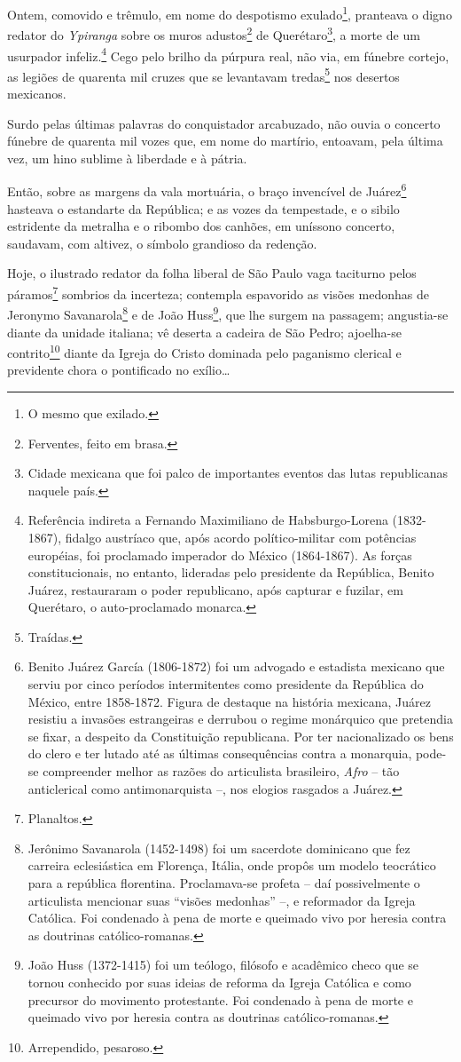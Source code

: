 Ontem, comovido e trêmulo, em nome do despotismo exulado\footnote{O
  mesmo que exilado.}, pranteava o digno redator do \emph{Ypiranga}
sobre os muros adustos\footnote{Ferventes, feito em brasa.} de
Querétaro\footnote{Cidade mexicana que foi palco de importantes
  eventos das lutas republicanas naquele país.}, a morte de um usurpador
infeliz.\footnote{Referência indireta a Fernando Maximiliano de
  Habsburgo-Lorena (1832-1867), fidalgo austríaco que, após acordo
  político-militar com potências européias, foi proclamado imperador do
  México (1864-1867). As forças constitucionais, no entanto, lideradas
  pelo presidente da República, Benito Juárez, restauraram o poder
  republicano, após capturar e fuzilar, em Querétaro, o auto-proclamado
  monarca.} Cego pelo brilho da púrpura real, não via, em fúnebre
cortejo, as legiões de quarenta mil cruzes que se levantavam
tredas\footnote{Traídas.} nos desertos mexicanos.

Surdo pelas últimas palavras do conquistador arcabuzado, não ouvia o
concerto fúnebre de quarenta mil vozes que, em nome do martírio,
entoavam, pela última vez, um hino sublime à liberdade e à pátria.

Então, sobre as margens da vala mortuária, o braço invencível de
Juárez\footnote{Benito Juárez García (1806-1872) foi um advogado e
  estadista mexicano que serviu por cinco períodos intermitentes como
  presidente da República do México, entre 1858-1872. Figura de destaque
  na história mexicana, Juárez resistiu a invasões estrangeiras e
  derrubou o regime monárquico que pretendia se fixar, a despeito da
  Constituição republicana. Por ter nacionalizado os bens do clero e ter
  lutado até as últimas consequências contra a monarquia, pode-se
  compreender melhor as razões do articulista brasileiro, \emph{Afro} --
  tão anticlerical como antimonarquista --, nos elogios rasgados a
  Juárez.} hasteava o estandarte da República; e as vozes da tempestade,
e o sibilo estridente da metralha e o ribombo dos canhões, em uníssono
concerto, saudavam, com altivez, o símbolo grandioso da redenção.

Hoje, o ilustrado redator da folha liberal de São Paulo vaga taciturno
pelos páramos\footnote{Planaltos.} sombrios da incerteza; contempla
espavorido as visões medonhas de Jeronymo Savanarola\footnote{Jerônimo
  Savanarola (1452-1498) foi um sacerdote dominicano que fez carreira
  eclesiástica em Florença, Itália, onde propôs um modelo teocrático
  para a república florentina. Proclamava-se profeta -- daí
  possivelmente o articulista mencionar suas ``visões medonhas'' --, e
  reformador da Igreja Católica. Foi condenado à pena de morte e
  queimado vivo por heresia contra as doutrinas católico-romanas.} e de
João Huss\footnote{João Huss (1372-1415) foi um teólogo, filósofo e
  acadêmico checo que se tornou conhecido por suas ideias de reforma da
  Igreja Católica e como precursor do movimento protestante. Foi
  condenado à pena de morte e queimado vivo por heresia contra as
  doutrinas católico-romanas.}, que lhe surgem na passagem; angustia-se
diante da unidade italiana; vê deserta a cadeira de São Pedro;
ajoelha-se contrito\footnote{Arrependido, pesaroso.} diante da Igreja
do Cristo dominada pelo paganismo clerical e previdente chora o
pontificado no exílio\ldots{}

